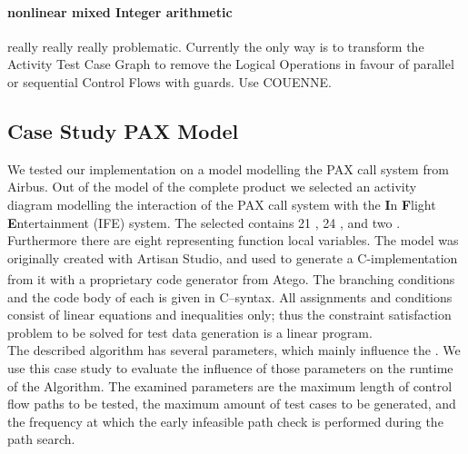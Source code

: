 \paragraph{nonlinear mixed Integer arithmetic}
really really really problematic. Currently the only way is to transform the Activity Test Case Graph to remove the Logical Operations in favour of parallel or sequential Control Flows with guards. Use COUENNE.
\subsection{Case Study PAX Model}
\label{sec:evaluationCaseStudy}
We tested our implementation on a model modelling the PAX call system from Airbus. Out of the model of the complete product we selected an activity diagram modelling the interaction of the PAX call system with the \textbf{I}n \textbf{F}light \textbf{E}ntertainment (IFE) system. The selected  contains 21 , 24 , and two . Furthermore there are eight  representing function local variables. The model was originally created with Artisan Studio, and used to generate a C-implementation from it with a proprietary code generator from Atego\textsuperscript{\textregistered}. The branching conditions and the code body of each  is given in C--syntax. All assignments and conditions consist of linear equations and inequalities only; thus the constraint satisfaction problem to be solved for test data generation is a linear program.\\
The described algorithm has several parameters, which mainly influence the . We use this case study to evaluate the influence of those parameters on the runtime of the Algorithm. The examined parameters are the maximum length of control flow paths to be tested, the maximum amount of test cases to be generated, and the frequency at which the early infeasible path check is performed during the path search.
